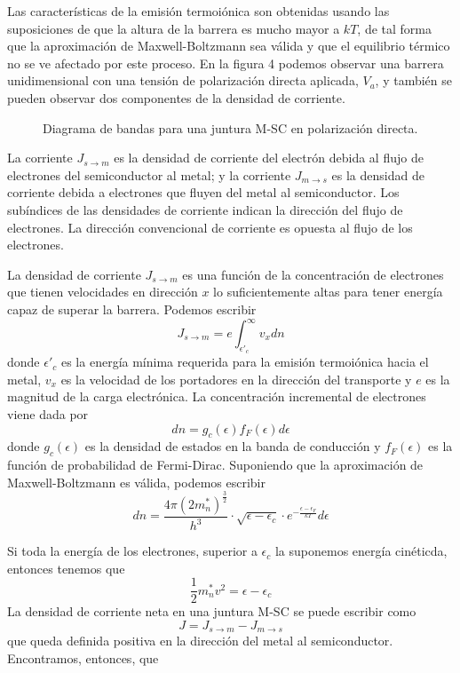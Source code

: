 \documentclass[12pt,a4paper]{article}
\begin{document}
Las características de la emisión termoiónica son obtenidas usando las suposiciones de que la altura de la barrera es mucho mayor a $kT$, de tal forma que la aproximación de Maxwell-Boltzmann sea válida y que el equilibrio térmico no se ve afectado por este proceso. En la figura 4 podemos observar una barrera unidimensional con una tensión de polarización directa aplicada, $V_{a}$, y también se pueden observar dos componentes de la densidad de corriente.

\begin{figure}[ht!]
\begin{center}
\caption{Diagrama de bandas para una juntura M-SC en polarización directa.}
\end{center}
\end{figure}

La corriente $J_{s \rightarrow m}$ es la densidad de corriente del electrón debida al flujo de electrones del semiconductor al metal; y la corriente $J_{m \rightarrow s}$ es la densidad de corriente debida a electrones que fluyen del metal al semiconductor. Los subíndices de las densidades de corriente indican la dirección del flujo de electrones. La dirección convencional de corriente es opuesta al flujo de los electrones.

La densidad de corriente $J_{s \rightarrow m}$ es una función de la concentración de electrones que tienen velocidades en dirección $x$ lo suficientemente altas para tener energía capaz de superar la barrera. Podemos escribir
\[ J_{s \rightarrow m}=e \int _{\epsilon'_{c}}^{\infty} v_{x} dn \]
donde $\epsilon'_{c}$ es la energía mínima requerida para la emisión termoiónica hacia el metal, $v_{x}$ es la velocidad de los portadores en la dirección del transporte y $e$ es la magnitud de la carga electrónica. La concentración incremental de electrones viene dada por
\[ dn = g_{c}(\epsilon)f_{F}(\epsilon) d\epsilon \]
donde $g_{c}(\epsilon)$ es la densidad de estados en la banda de conducción y $f_{F}(\epsilon)$ es la función de probabilidad de Fermi-Dirac. Suponiendo que la aproximación de Maxwell-Boltzmann es válida, podemos escribir
\[ dn=\frac{4 \pi (2m^{\ast}_{n})^{\frac{3}{2}}}{h^{3}} \cdot \sqrt{\epsilon - \epsilon _{c}} \cdot e^{-\frac{\epsilon - \epsilon _{F}}{kT}} d\epsilon \]

Si toda la energía de los electrones, superior a $\epsilon _{c}$ la suponemos energía cinéticda, entonces tenemos que
\[ \frac{1}{2} m_{n}^{\ast} v^{2}=\epsilon - \epsilon _{c} \]
La densidad de corriente neta en una juntura M-SC se puede escribir como
\[ J=J_{s \rightarrow m}-J_{m \rightarrow s} \]
que queda definida positiva en la dirección del metal al semiconductor. Encontramos, entonces, que
\end{document}
